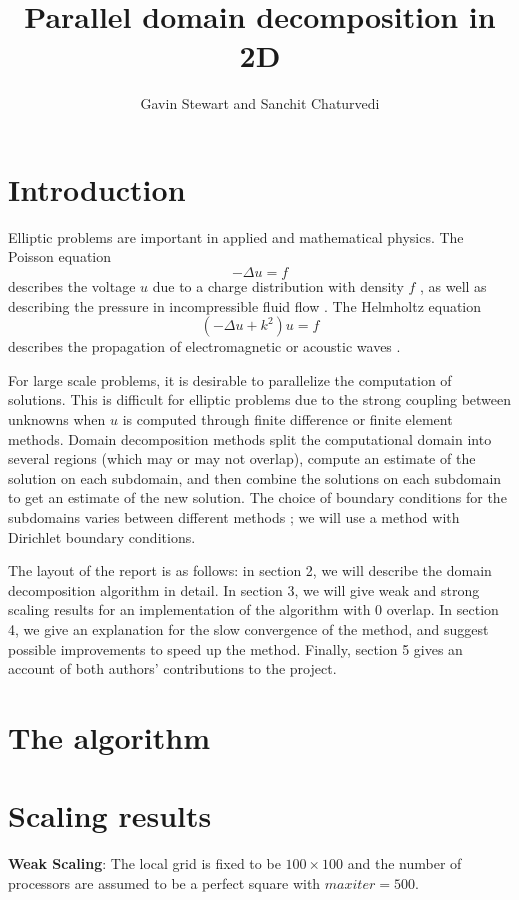 \documentclass{article}
\title{Parallel domain decomposition in 2D}
\author{Gavin Stewart and Sanchit Chaturvedi}
\begin{document}
	\maketitle
	
	\section{Introduction}
	 
	Elliptic problems are important in applied and mathematical physics.  The Poisson equation 
	\begin{equation}
		-\Delta u = f
	\end{equation} describes the voltage \(u\) due to a charge distribution with density \(f\)%
	, as well as describing the pressure in incompressible fluid flow \cite{Marshall97}. The Helmholtz equation
	\begin{equation}
		(-\Delta u + k^2)u = f
	\end{equation} 
	describes the propagation of electromagnetic or acoustic waves \cite{Fairweather03}.
	
	For large scale problems, it is desirable to parallelize the computation of solutions.  This is difficult for elliptic problems due to the strong coupling between unknowns when \(u\) is computed through finite difference or finite element methods.  Domain decomposition methods split the computational domain into several regions (which may or may not overlap), compute an estimate of the solution on each  subdomain, and then combine the solutions on each subdomain to get an estimate of the new solution.  The choice of boundary conditions for the subdomains varies between different methods%
	; we will use a method with Dirichlet boundary conditions.
	
	The layout of the report is as follows: in section 2, we will describe the domain decomposition algorithm in detail.  In section 3, we will give weak and strong scaling results for an implementation of the algorithm with \(0\) overlap.  In section 4, we give an explanation for the slow convergence of the method, and suggest possible improvements to speed up the method.  Finally, section 5 gives an account of both authors' contributions to the project.
	
	\section{The algorithm}
	
	\section{Scaling results}
	\textbf{Weak Scaling}: The local grid is fixed to be $100\times100$ and the number of processors are assumed to be a perfect square with $max iter=500$. 
	
\end{document}
